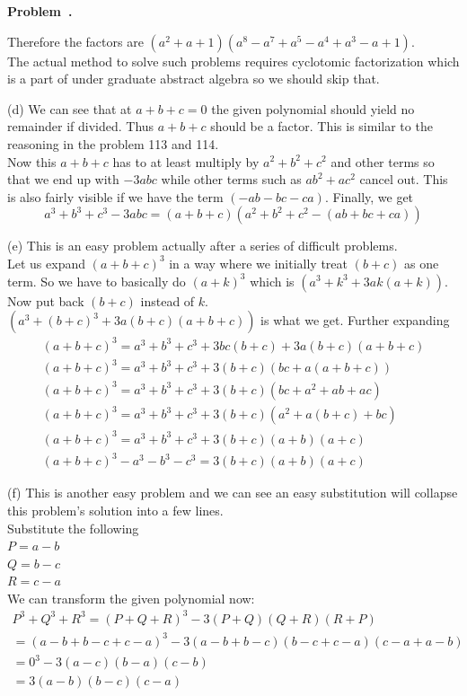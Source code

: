 \documentclass[10pt]{article}
\newcounter{problem}
\newenvironment{problem}[1][]{
  \refstepcounter{problem}
  \par\noindent\textbf{Problem~\theproblem. #1}\par
  \vspace{0.5em}
}{\vspace{1em}}
\begin{document}
\begin{problem}
  Therefore the factors are $(a^2 + a + 1)(a^8 - a^7 + a^5 - a^4 + a^3 - a + 1)$.\\

  The actual method to solve such problems requires cyclotomic factorization which is a part of under graduate abstract algebra so we should skip that.

  (d) 
  We can see that at $a + b + c = 0$ the given polynomial should yield no remainder if divided. Thus $a + b + c$ should be a factor. This is
  similar to the reasoning in the problem 113 and 114.\\

  Now this $a + b + c$ has to at least multiply by $a^2 + b^2 + c^2$ and other terms so that we end up with $-3 abc$
  while other terms such as $ab^2 + ac^2$ cancel out. This is also fairly visible if we have the term $(- ab - bc - ca)$.
  Finally, we get\\
  \[
  a^3 + b^3 + c^3 - 3abc = (a + b + c)(a^2 + b^2 + c^2 - (ab + bc + ca))
  \]

  (e)
  This is an easy problem actually after a series of difficult problems.\\

  Let us expand $(a + b + c)^3$ in a way where we initially treat $(b + c)$ as one term. So we have to basically do
  $(a + k)^3$ which is $(a^3 + k^3 + 3ak(a + k))$. Now put back $(b + c)$ instead of $k$. $(a^3 + (b + c)^3 + 3a(b + c)(a + b +c))$ is what we get.
  Further expanding\\
\begin{gather*}
    (a + b + c)^3 = a^3 + b^3 + c^3 + 3bc(b + c) + 3a(b + c)(a + b +c)\\
    (a + b + c)^3 = a^3 + b^3 + c^3 + 3(b + c) (bc + a(a + b +c))\\
    (a + b + c)^3 = a^3 + b^3 + c^3 + 3(b + c) (bc + a^2 + ab + ac)\\
    (a + b + c)^3 = a^3 + b^3 + c^3 + 3(b + c) (a^2 + a(b + c) +bc)\\
    (a + b + c)^3 = a^3 + b^3 + c^3 + 3(b + c) (a + b) (a + c)\\
    (a + b + c)^3 - a^3 - b^3 - c^3 = 3(b + c) (a + b) (a + c)
\end{gather*}

(f)
This is another easy problem and we can see an easy substitution will collapse this problem's solution into a few lines.\\

Substitute the following\\
$P = a - b$\\
$Q = b - c$\\
$R = c - a$\\

We can transform the given polynomial now:
\begin{gather*}
  P^3 + Q^3 + R^3
  = (P + Q + R)^3 - 3 (P + Q) (Q + R)(R + P)\\
  = (a - b + b - c + c - a)^3 - 3 (a - b + b - c)(b - c + c - a)(c - a + a - b)\\
  = 0^3 - 3 (a - c) (b - a) (c - b)\\
  = 3 (a - b)(b - c)(c - a)
\end{gather*}
\end{problem}
\end{document}
